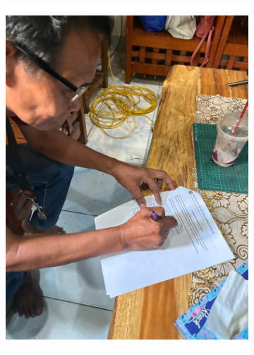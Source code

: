 \begin{appendices}
\begin{figure}[H]
    \centering
    \begin{subfigure}{0.4\textwidth}
        \centering
        \includegraphics[width=\linewidth]{images/docs/sign1.pdf}
    \end{subfigure}
    \quad
    \begin{subfigure}{0.4\textwidth}
        \centering

\end{subfigure}
\end{figure}
\end{appendices}
